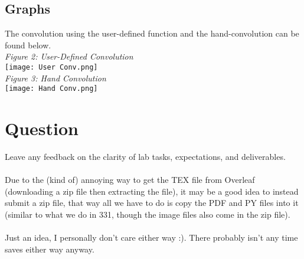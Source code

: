 \documentclass[12pt,a4paper]{article}
\begin{document}
\subsection{Graphs}
The convolution using the user-defined function and the hand-convolution can be found below.
\\
\textit{Figure 2: User-Defined Convolution}
\\
\texttt{[image: User Conv.png]}
\\
\textit{Figure 3: Hand Convolution}
\\
\texttt{[image: Hand Conv.png]}
\newpage
\section{Question}
Leave any feedback on the clarity of lab tasks, expectations, and deliverables.\\
\\
Due to the (kind of) annoying way to get the TEX file from Overleaf (downloading a zip file then extracting the file), it may be a good idea to instead submit a zip file, that way all we have to do is copy the PDF and PY files into it (similar to what we do in 331, though the image files also come in the zip file).\\
\\
Just an idea, I personally don't care either way :). There probably isn't any time saves either way anyway.
\end{document}
